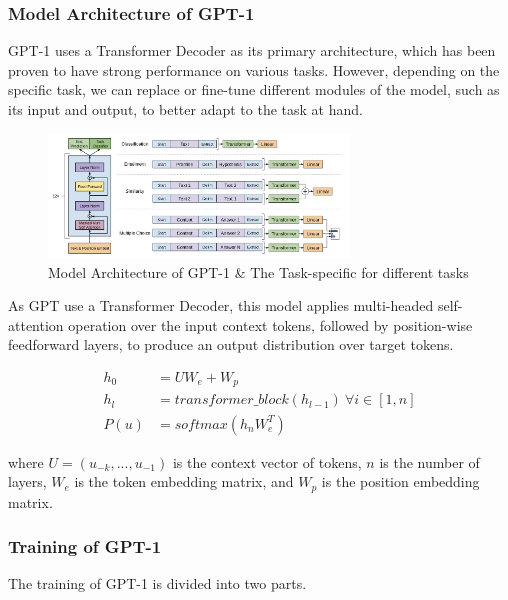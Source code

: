 \documentclass[conference]{IEEEtran}
\begin{document}
\subsubsection{Model Architecture of GPT-1}

\par GPT-1 uses a Transformer Decoder\cite{liu2018generating} as its primary architecture, 
which has been proven to have strong performance on various tasks. However, 
depending on the specific task, we can replace or fine-tune different modules 
of the model, such as its input and output, to better adapt to the task at hand.

\begin{figure}[htbp]
    \centerline{\includegraphics[width = 8cm]{pic/fig5.png}}
    \caption{Model Architecture of GPT-1 \& The Task-specific for different tasks}
    \label{fig}
\end{figure}

\par As GPT use a Transformer Decoder, this model applies multi-headed self-attention 
operation over the input context tokens, followed by position-wise feedforward layers, 
to produce an output distribution over target tokens.

\begin{align*}
    h_0 &= UW_e + W_p \\
    h_l &= transformer\_block(h_{l-1})\ \forall i \in \left[1, n\right] \\
    P(u) &= softmax(h_n W_e^T)
\end{align*}

\par where $U = (u_{-k}, ..., u_{-1})$ is the context vector of tokens, $n$ is the number of layers, 
$W_e$ is the token embedding matrix, and $W_p$ is the position embedding matrix.

\subsubsection{Training of GPT-1}

\par The training of GPT-1 is divided into two parts.
\end{document}
